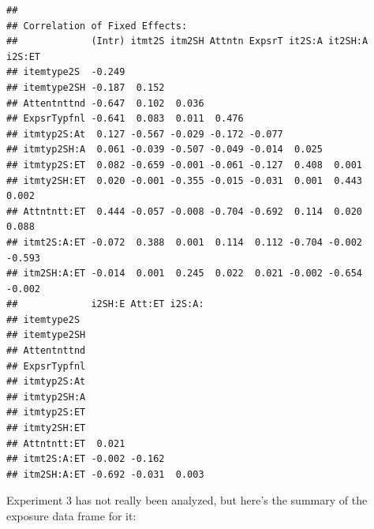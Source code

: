 \documentclass[11pt]{article}\usepackage[]{graphicx}\usepackage[]{color}
\makeatletter
\newenvironment{kframe}{%
 \def\at@end@of@kframe{}%
 \ifinner\ifhmode%
  \def\at@end@of@kframe{\end{minipage}}%
  \begin{minipage}{\columnwidth}%
 \fi\fi%
 \def\FrameCommand##1{\hskip\@totalleftmargin \hskip-\fboxsep
 \colorbox{shadecolor}{##1}\hskip-\fboxsep
     \hskip-\linewidth \hskip-\@totalleftmargin \hskip\columnwidth}%
 \MakeFramed {\advance\hsize-\width
   \@totalleftmargin\z@ \linewidth\hsize
   \@setminipage}}%
 {\par\unskip\endMakeFramed%
 \at@end@of@kframe}
\newenvironment{knitrout}{}{} %
\makeatother
\begin{document}
\begin{knitrout}
\begin{kframe}
\begin{verbatim}
## 
## Correlation of Fixed Effects:
##             (Intr) itmt2S itm2SH Attntn ExpsrT it2S:A it2SH:A i2S:ET
## itemtype2S  -0.249                                                  
## itemtype2SH -0.187  0.152                                           
## Attentnttnd -0.647  0.102  0.036                                    
## ExpsrTypfnl -0.641  0.083  0.011  0.476                             
## itmtyp2S:At  0.127 -0.567 -0.029 -0.172 -0.077                      
## itmtyp2SH:A  0.061 -0.039 -0.507 -0.049 -0.014  0.025               
## itmtyp2S:ET  0.082 -0.659 -0.001 -0.061 -0.127  0.408  0.001        
## itmty2SH:ET  0.020 -0.001 -0.355 -0.015 -0.031  0.001  0.443   0.002
## Attntntt:ET  0.444 -0.057 -0.008 -0.704 -0.692  0.114  0.020   0.088
## itmt2S:A:ET -0.072  0.388  0.001  0.114  0.112 -0.704 -0.002  -0.593
## itm2SH:A:ET -0.014  0.001  0.245  0.022  0.021 -0.002 -0.654  -0.002
##             i2SH:E Att:ET i2S:A:
## itemtype2S                      
## itemtype2SH                     
## Attentnttnd                     
## ExpsrTypfnl                     
## itmtyp2S:At                     
## itmtyp2SH:A                     
## itmtyp2S:ET                     
## itmty2SH:ET                     
## Attntntt:ET  0.021              
## itmt2S:A:ET -0.002 -0.162       
## itm2SH:A:ET -0.692 -0.031  0.003
\end{verbatim}
\end{kframe}
\end{knitrout}

Experiment 3 has not really been analyzed, but here's the summary of the exposure data frame for it:
\end{document}
